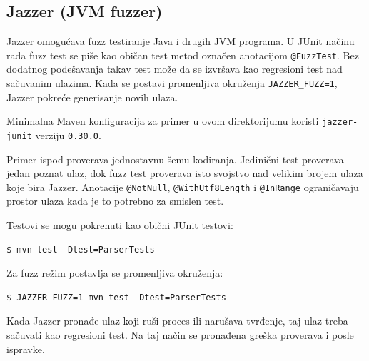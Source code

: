 \subsection{Jazzer (JVM fuzzer)}\label{jazzer-jvm-fuzzer}

Jazzer omogućava fuzz testiranje Java i drugih JVM programa. U JUnit načinu rada fuzz test se piše kao običan test metod označen anotacijom \texttt{@FuzzTest}. Bez dodatnog podešavanja takav test može da se izvršava kao regresioni test nad sačuvanim ulazima. Kada se postavi promenljiva okruženja \texttt{JAZZER\_FUZZ=1}, Jazzer pokreće generisanje novih ulaza.

Minimalna Maven konfiguracija za primer u ovom direktorijumu koristi \texttt{jazzer-junit} verziju \texttt{0.30.0}.


Primer ispod proverava jednostavnu šemu kodiranja. Jedinični test proverava jedan poznat ulaz, dok fuzz test proverava isto svojstvo nad velikim brojem ulaza koje bira Jazzer. Anotacije \texttt{@NotNull}, \texttt{@WithUtf8Length} i \texttt{@InRange} ograničavaju prostor ulaza kada je to potrebno za smislen test.



Testovi se mogu pokrenuti kao obični JUnit testovi:

\begin{verbatim}
$ mvn test -Dtest=ParserTests
\end{verbatim}

Za fuzz režim postavlja se promenljiva okruženja:

\begin{verbatim}
$ JAZZER_FUZZ=1 mvn test -Dtest=ParserTests
\end{verbatim}

Kada Jazzer pronađe ulaz koji ruši proces ili narušava tvrđenje, taj ulaz treba sačuvati kao regresioni test. Na taj način se pronađena greška proverava i posle ispravke.
